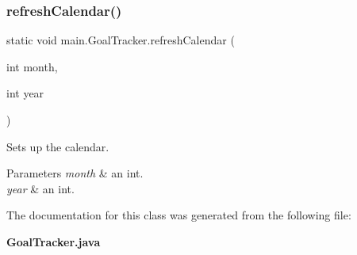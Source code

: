 \subsubsection{refresh\+Calendar()}
{\footnotesize\ttfamily static void main.\+Goal\+Tracker.\+refresh\+Calendar (\begin{DoxyParamCaption}\item[{int}]{month,  }\item[{int}]{year }\end{DoxyParamCaption})\hspace{0.3cm}{\ttfamily [static]}}

Sets up the calendar. 
\begin{DoxyParams}{Parameters}
{\em month} & an int. \\
\hline
{\em year} & an int. \\
\hline
\end{DoxyParams}


The documentation for this class was generated from the following file\+:\begin{DoxyCompactItemize}
\item 
\textbf{ Goal\+Tracker.\+java}\end{DoxyCompactItemize}
